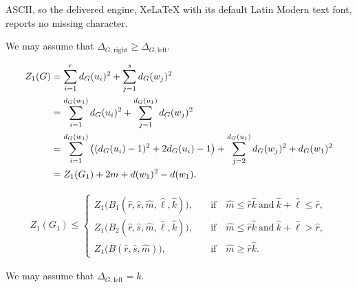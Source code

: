 \documentclass[10pt,a4paper]{amsart}
\begin{document}
ASCII, so the delivered engine, XeLaTeX with its default Latin Modern text font, reports no missing character.
    \begin{claim}\label{CLAIM:dw1>=du1}
        We may assume that $\Delta_{G, \mathrm{right}} \ge \Delta_{G, \mathrm{left}}$.  
    \end{claim}

    \begin{align}\label{equ:ZG-and-ZG1}
        Z_{1}(G) 
        & = \sum_{i=1}^{r}d_{G}(u_i)^2 + \sum_{j=1}^{s} d_{G}(w_j)^2 \notag \\ 
        & =\sum_{i=1}^{d_{G}(w_1)}d_{G}(u_i)^2 + \sum_{j=1}^{d_{G}(u_1)} d_{G}(w_j)^2 \notag \\
        & =\sum_{i=1}^{d_{G}(w_1)} \big( (d_{G}(u_i)-1)^2  + 2d_{G}(u_i) - 1 \big)  + \sum_{j=2}^{d_{G}(u_1)} d_{G}(w_j)^2 +  d_{G}(w_1)^2 \notag \\
        &= Z_{1}(G_1)+  2m  +d(w_1)^2 - d(w_1).
    \end{align}

    \begin{align}\label{equ:induction-ZG1}
        Z_{1}(G_1) \le 
        \begin{cases}
            Z_{1}\big( B_1(\hat{r}, \hat{s}, \hat{m}, \hat{\ell}, \hat{k}) \big), &\quad\text{if}\quad \hat{m} \le \hat{r} \hat{k} ~\text{and}~ \hat{k} + \hat{\ell} \le \hat{r}, \\[0.5em]
            Z_{1}\big( B_2(\hat{r}, \hat{s}, \hat{m}, \hat{\ell}, \hat{k}) \big), &\quad\text{if}\quad \hat{m} \le \hat{r} \hat{k} ~\text{and}~ \hat{k} + \hat{\ell} > \hat{r}, \\[0.5em]
            Z_{1}\big( B(\hat{r}, \hat{s}, \hat{m}) \big), &\quad\text{if}\quad \hat{m} \ge \hat{r} \hat{k}. 
        \end{cases}
    \end{align}

    \begin{claim}\label{THM-bi-degree-du1}
        We may assume that $\Delta_{G, \mathrm{left}} = k$. 
    \end{claim}
\end{document}

